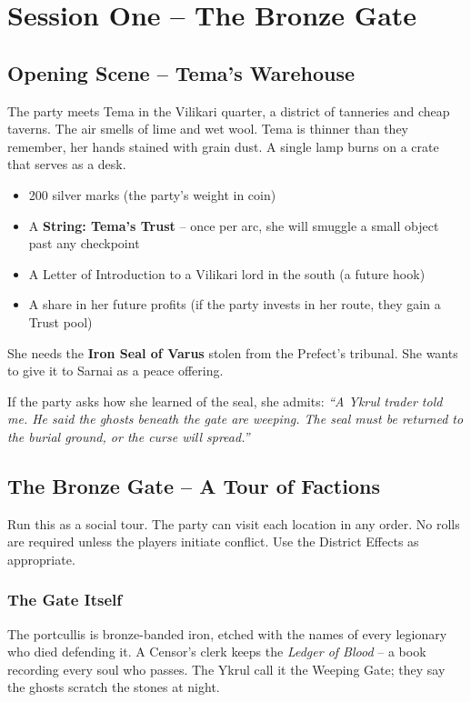 \documentclass[10pt,twoside]{book}
\begin{document}
\chapter{Session One -- The Bronze Gate}

\section{Opening Scene -- Tema's Warehouse}

The party meets Tema in the Vilikari quarter, a district of tanneries and cheap taverns. The air smells of lime and wet wool. Tema is thinner than they remember, her hands stained with grain dust. A single lamp burns on a crate that serves as a desk.

\begin{sidebar}
\begin{itemize}
\item 200 silver marks (the party's weight in coin)
\item A \textbf{String: Tema's Trust} -- once per arc, she will smuggle a small object past any checkpoint
\item A Letter of Introduction to a Vilikari lord in the south (a future hook)
\item A share in her future profits (if the party invests in her route, they gain a Trust pool)
\end{itemize}
She needs the \textbf{Iron Seal of Varus} stolen from the Prefect's tribunal. She wants to give it to Sarnai as a peace offering.
\end{sidebar}

If the party asks how she learned of the seal, she admits: \textit{``A Ykrul trader told me. He said the ghosts beneath the gate are weeping. The seal must be returned to the burial ground, or the curse will spread.''}

\section{The Bronze Gate -- A Tour of Factions}

Run this as a social tour. The party can visit each location in any order. No rolls are required unless the players initiate conflict. Use the District Effects as appropriate.

\subsection{The Gate Itself}
The portcullis is bronze-banded iron, etched with the names of every legionary who died defending it. A Censor's clerk keeps the \textit{Ledger of Blood} -- a book recording every soul who passes. The Ykrul call it the Weeping Gate; they say the ghosts scratch the stones at night.
\end{document}

